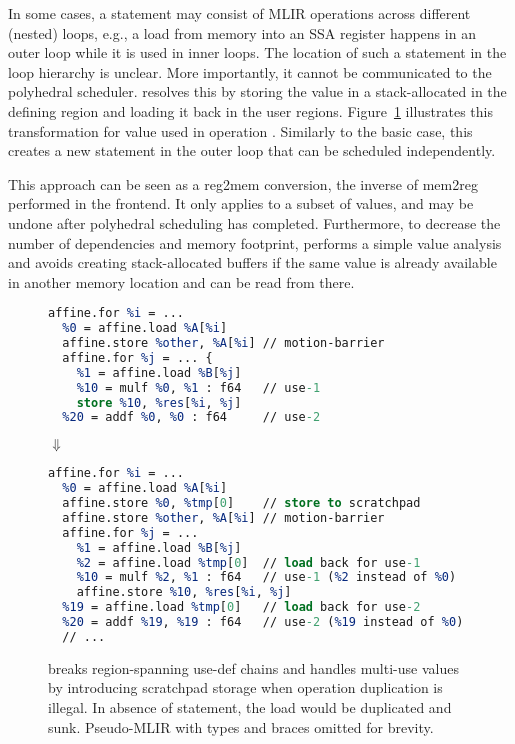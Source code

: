 
In some cases, a statement may consist of MLIR operations across different (nested) loops, e.g., a load from memory into an SSA register happens in an outer loop while it is used in inner loops. The location of such a statement in the loop hierarchy is unclear. More importantly, it cannot be communicated to the polyhedral scheduler. \tool resolves this by storing the value in a stack-allocated  in the defining region and loading it back in the user regions. Figure~\ref{fig:scratchpad} illustrates this transformation for value  used in operation . Similarly to the basic case, this creates a new statement in the outer loop that can be scheduled independently.

This approach can be seen as a reg2mem conversion, the inverse of mem2reg performed in the frontend. It only applies to a subset of values, and may be undone after polyhedral scheduling has completed. Furthermore, to decrease the number of dependencies and memory footprint, \tool performs a simple value analysis and avoids creating stack-allocated buffers if the same value is already available in another memory location and can be read from there.


\begin{figure}
\centering
{\scriptsize
\begin{lstlisting}[language=llvm, escapeinside=**, mathescape=true]
affine.for %i = ...
  %0 = affine.load %A[%i]
  affine.store %other, %A[%i] // motion-barrier
  affine.for %j = ... {
    %1 = affine.load %B[%j]
    %10 = mulf %0, %1 : f64   // use-1
    store %10, %res[%i, %j]
  %20 = addf %0, %0 : f64     // use-2
\end{lstlisting}}
$\Downarrow$
{\scriptsize
\begin{lstlisting}[language=llvm, escapeinside=**, mathescape=true]
%tmp = memref.alloca() : memref<1xf64>
affine.for %i = ...
  %0 = affine.load %A[%i]
  affine.store %0, %tmp[0]    // store to scratchpad
  affine.store %other, %A[%i] // motion-barrier
  affine.for %j = ...
    %1 = affine.load %B[%j]
    %2 = affine.load %tmp[0]  // load back for use-1
    %10 = mulf %2, %1 : f64   // use-1 (%2 instead of %0)
    affine.store %10, %res[%i, %j]
  %19 = affine.load %tmp[0]   // load back for use-2
  %20 = addf %19, %19 : f64   // use-2 (%19 instead of %0)
  // ...
\end{lstlisting}
}
\caption{\tool breaks region-spanning use-def chains and handles multi-use values by introducing scratchpad storage when operation duplication is illegal. In absence of  statement, the  load would be duplicated and sunk. Pseudo-MLIR with types and braces omitted for brevity.}
\label{fig:scratchpad}
\end{figure}

